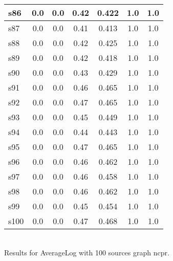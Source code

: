 \documentclass{article}
\begin{document}
\begin{tabular}{|l|c|c|c|c|c|c|}
\hline
s86 &0.0 & 0.0 & 0.42 & 0.422 & 1.0 & 1.0\\
\hline
s87 &0.0 & 0.0 & 0.41 & 0.413 & 1.0 & 1.0\\
\hline
s88 &0.0 & 0.0 & 0.42 & 0.425 & 1.0 & 1.0\\
\hline
s89 &0.0 & 0.0 & 0.42 & 0.418 & 1.0 & 1.0\\
\hline
s90 &0.0 & 0.0 & 0.43 & 0.429 & 1.0 & 1.0\\
\hline
s91 &0.0 & 0.0 & 0.46 & 0.465 & 1.0 & 1.0\\
\hline
s92 &0.0 & 0.0 & 0.47 & 0.465 & 1.0 & 1.0\\
\hline
s93 &0.0 & 0.0 & 0.45 & 0.449 & 1.0 & 1.0\\
\hline
s94 &0.0 & 0.0 & 0.44 & 0.443 & 1.0 & 1.0\\
\hline
s95 &0.0 & 0.0 & 0.47 & 0.465 & 1.0 & 1.0\\
\hline
s96 &0.0 & 0.0 & 0.46 & 0.462 & 1.0 & 1.0\\
\hline
s97 &0.0 & 0.0 & 0.46 & 0.458 & 1.0 & 1.0\\
\hline
s98 &0.0 & 0.0 & 0.46 & 0.462 & 1.0 & 1.0\\
\hline
s99 &0.0 & 0.0 & 0.45 & 0.454 & 1.0 & 1.0\\
\hline
s100 &0.0 & 0.0 & 0.47 & 0.468 & 1.0 & 1.0\\
\hline
\end{tabular}\\

\noindent Results for AverageLog with 100 sources graph ncpr.
\end{document}
